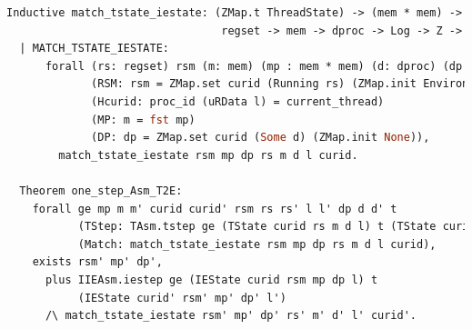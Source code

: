 \begin{lstlisting}[language=Caml]
  Inductive match_tstate_iestate: (ZMap.t ThreadState) -> (mem * mem) -> (ZMap.t (option dproc)) ->
                                 regset -> mem -> dproc -> Log -> Z -> Prop :=
  | MATCH_TSTATE_IESTATE:
      forall (rs: regset) rsm (m: mem) (mp : mem * mem) (d: dproc) (dp : ZMap.t (option dproc)) curid l
             (RSM: rsm = ZMap.set curid (Running rs) (ZMap.init Environment))
             (Hcurid: proc_id (uRData l) = current_thread)
             (MP: m = fst mp)
             (DP: dp = ZMap.set curid (Some d) (ZMap.init None)),        
        match_tstate_iestate rsm mp dp rs m d l curid.

  Theorem one_step_Asm_T2E:
    forall ge mp m m' curid curid' rsm rs rs' l l' dp d d' t
           (TStep: TAsm.tstep ge (TState curid rs m d l) t (TState curid' rs' m' d' l'))
           (Match: match_tstate_iestate rsm mp dp rs m d l curid),
    exists rsm' mp' dp',
      plus IIEAsm.iestep ge (IEState curid rsm mp dp l) t
           (IEState curid' rsm' mp' dp' l')
      /\ match_tstate_iestate rsm' mp' dp' rs' m' d' l' curid'.
\end{lstlisting}

